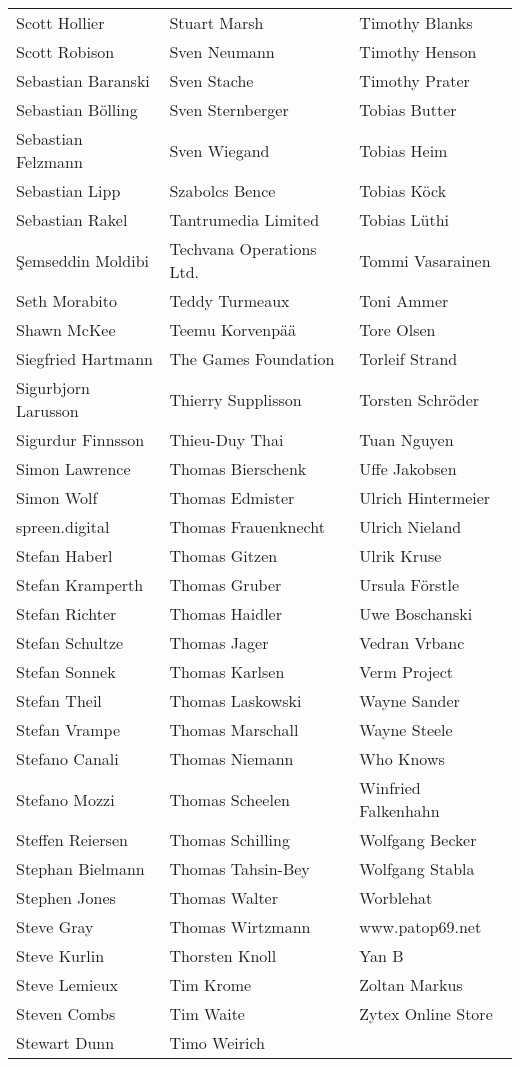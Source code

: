 \begin{tabular}{p{4.5cm}p{4.5cm}p{4.5cm}}
Scott Hollier & Stuart Marsh & Timothy Blanks \\
Scott Robison & Sven Neumann & Timothy Henson \\
Sebastian Baranski & Sven Stache & Timothy Prater \\
Sebastian Bölling & Sven Sternberger & Tobias Butter \\
Sebastian Felzmann & Sven Wiegand & Tobias Heim \\
Sebastian Lipp & Szabolcs Bence & Tobias Köck \\
Sebastian Rakel & Tantrumedia Limited & Tobias Lüthi \\
Şemseddin Moldibi & Techvana Operations Ltd. & Tommi Vasarainen \\
Seth Morabito & Teddy Turmeaux & Toni Ammer \\
Shawn McKee & Teemu Korvenpää & Tore Olsen \\
Siegfried Hartmann & The Games Foundation & Torleif Strand \\
Sigurbjorn Larusson & Thierry Supplisson & Torsten Schröder \\
Sigurdur Finnsson & Thieu-Duy Thai & Tuan Nguyen \\
Simon Lawrence & Thomas Bierschenk & Uffe Jakobsen \\
Simon Wolf & Thomas Edmister & Ulrich Hintermeier \\
spreen.digital & Thomas Frauenknecht & Ulrich Nieland \\
Stefan Haberl & Thomas Gitzen & Ulrik Kruse \\
Stefan Kramperth & Thomas Gruber & Ursula Förstle \\
Stefan Richter & Thomas Haidler & Uwe Boschanski \\
Stefan Schultze & Thomas Jager & Vedran Vrbanc \\
Stefan Sonnek & Thomas Karlsen & Verm Project \\
Stefan Theil & Thomas Laskowski & Wayne Sander \\
Stefan Vrampe & Thomas Marschall & Wayne Steele \\
Stefano Canali & Thomas Niemann & Who Knows \\
Stefano Mozzi & Thomas Scheelen & Winfried Falkenhahn \\
Steffen Reiersen & Thomas Schilling & Wolfgang Becker \\
Stephan Bielmann & Thomas Tahsin-Bey & Wolfgang Stabla \\
Stephen Jones & Thomas Walter & Worblehat \\
Steve Gray & Thomas Wirtzmann & www.patop69.net \\
Steve Kurlin & Thorsten Knoll & Yan B \\
Steve Lemieux & Tim Krome & Zoltan Markus \\
Steven Combs & Tim Waite & Zytex Online Store \\
Stewart Dunn & Timo Weirich &  \\
\end{tabular}
